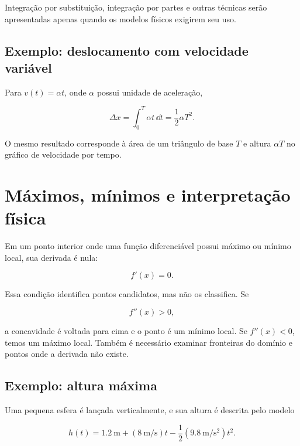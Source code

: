 Integração por substituição, integração por partes e outras técnicas serão apresentadas apenas quando os modelos físicos exigirem seu uso.

\subsection*{Exemplo: deslocamento com velocidade variável}

Para $v(t)=\alpha t$, onde $\alpha$ possui unidade de aceleração,

\begin{equation}
  \Delta x
  =\int_0^T \alpha t\,\dd t
  =\frac{1}{2}\alpha T^2.
\end{equation}

O mesmo resultado corresponde à área de um triângulo de base $T$ e altura $\alpha T$ no gráfico de velocidade por tempo.

\section{Máximos, mínimos e interpretação física}

Em um ponto interior onde uma função diferenciável possui máximo ou mínimo local, sua derivada é nula:

\begin{equation}
  f'(x)=0.
\end{equation}

Essa condição identifica pontos candidatos, mas não os classifica. Se

\begin{equation}
  f''(x)>0,
\end{equation}

a concavidade é voltada para cima e o ponto é um mínimo local. Se $f''(x)<0$, temos um máximo local. Também é necessário examinar fronteiras do domínio e pontos onde a derivada não existe.

\subsection*{Exemplo: altura máxima}

Uma pequena esfera é lançada verticalmente, e sua altura é descrita pelo modelo

\begin{equation}
  h(t)=\SI{1.2}{\meter}
       +\left(\SI{8}{\meter\per\second}\right)t
       -\frac{1}{2}\left(\SI{9.8}{\meter\per\second\squared}\right)t^2.
\end{equation}


